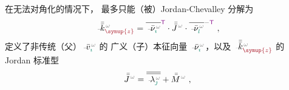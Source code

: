  在无法对角化的情况下， 最多只能（被）\textcolor{PineGreen}{Jordan-Chevalley 分解}为
\begin{align} \label{eq:kz-Jordan_decompose}
	\Xint{\begin{smallmatrix} ~ \\ {}^{}_{\mathcolor{gray}{-}} \\ ~ \end{smallmatrix}}{15}{\bar{\bar{k}}}_{\textcolor{Maroon}{\symup{z}}}^{\;\! \mathcolor{gray}{\omega}} = \overline{\Xint{\begin{smallmatrix} ~ \\ {}^{}_{\mathcolor{gray}{-}} \\ ~ \end{smallmatrix}}{15}{\bar{\nu}}^{\;\!\mathcolor{gray}{\omega}}_{\textcolor{PineGreen}{\imath}}}^{\mathsf{\textcolor{Plum}{T}}} \cdot \bar{\bar{J}}^{\;\!\mathcolor{gray}{\omega}} \cdot \overline{\Xint{\begin{smallmatrix} ~ \\ {}^{}_{\mathcolor{gray}{-}} \\ ~ \end{smallmatrix}}{15}{\bar{\nu}}^{\;\!\mathcolor{gray}{\omega}}_{\textcolor{PineGreen}{l}}}^{-{\mathsf{\textcolor{Plum}{T}}}} ~,
\end{align}
定义了非传统（父）$\Xint{\begin{smallmatrix} ~ \\ {}^{}_{\mathcolor{gray}{-}} \\ ~ \end{smallmatrix}}{15}{\bar{v}}^{\;\!\mathcolor{gray}{\omega}}_{\textcolor{PineGreen}{\imath}}$ 的 广义（子）\textcolor{PineGreen}{本征向量} $\Xint{\begin{smallmatrix} ~ \\ {}^{}_{\mathcolor{gray}{-}} \\ ~ \end{smallmatrix}}{15}{\bar{\nu}}^{\;\!\mathcolor{gray}{\omega}}_{\textcolor{PineGreen}{\imath}}$，以及 $\Xint{\begin{smallmatrix} ~ \\ {}^{}_{\mathcolor{gray}{-}} \\ ~ \end{smallmatrix}}{15}{\bar{\bar{k}}}_{\textcolor{Maroon}{\symup{z}}}^{\;\! \mathcolor{gray}{\omega}}$ 的 \textcolor{PineGreen}{Jordan 标准型}
\begin{align} \label{eq:kz-Jordan_normal_form}
	\bar{\bar{J}}^{\;\!\mathcolor{gray}{\omega}} = \overline{\overline{\Xint{\begin{smallmatrix} ~ \\ {}^{}_{\mathcolor{gray}{-}} \\ ~ \end{smallmatrix}}{22}{\lambda}^{\;\!\mathcolor{gray}{\omega}}_{\textcolor{PineGreen}{\jmath}}}} + \bar{\bar{M}}^{\;\!\mathcolor{gray}{\omega}} ~,
\end{align}
